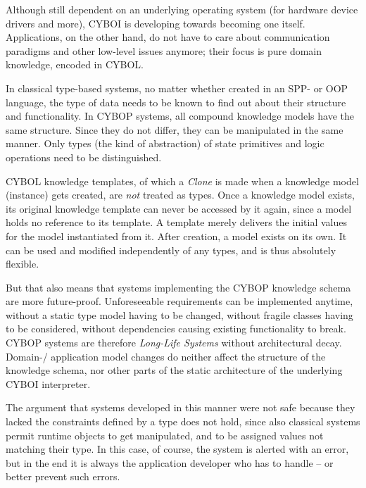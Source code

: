Although still dependent on an underlying operating system (for hardware device
drivers and more), CYBOI is developing towards becoming one itself. Applications,
on the other hand, do not have to care about communication paradigms and other
low-level issues anymore; their focus is pure domain knowledge, encoded in CYBOL.


In classical type-based systems, no matter whether created in an SPP- or OOP
language, the type of data needs to be known to find out about their structure
and functionality. In CYBOP systems, all compound knowledge models have the
same structure. Since they do not differ, they can be manipulated in the same
manner. Only types (the kind of abstraction) of state primitives and logic
operations need to be distinguished.

CYBOL knowledge templates, of which a \emph{Clone} is made when a knowledge
model (instance) gets created, are \emph{not} treated as types. Once a
knowledge model exists, its original knowledge template can never be accessed
by it again, since a model holds no reference to its template. A template
merely delivers the initial values for the model instantiated from it. After
creation, a model exists on its own. It can be used and modified independently
of any types, and is thus absolutely flexible.

But that also means that systems implementing the CYBOP knowledge schema are
more future-proof. Unforeseeable requirements can be implemented anytime,
without a static type model having to be changed, without fragile classes
having to be considered, without dependencies causing existing functionality to
break. CYBOP systems are therefore \emph{Long-Life Systems} without
architectural decay. Domain-/ application model changes do neither affect the
structure of the knowledge schema, nor other parts of the static architecture
of the underlying CYBOI interpreter.

The argument that systems developed in this manner were not safe because they
lacked the constraints defined by a type does not hold, since also classical
systems permit runtime objects to get manipulated, and to be assigned values
not matching their type. In this case, of course, the system is alerted with an
error, but in the end it is always the application developer who has to handle
-- or better prevent such errors.
